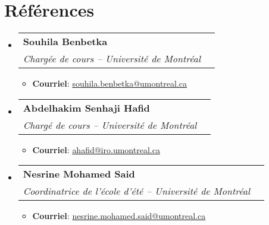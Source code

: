 \documentclass[letterpaper,11pt]{article}
\makeatletter
\newcommand{\resumeItem}[1]{
  \item\small{
    {#1 \vspace{-2pt}}
  }
}
\newcommand{\resumeSubheading}[4]{
  \vspace{-2pt}\item
    \begin{tabular*}{0.97\textwidth}[t]{l@{\extracolsep{\fill}}r}
      \textbf{#1} & #2 \\
      \textit{\small#3} & \textit{\small #4} \\
    \end{tabular*}\vspace{-7pt}
}
\newcommand{\resumeItemListStart}{\begin{itemize}}
\newcommand{\resumeItemListEnd}{\end{itemize}\vspace{-5pt}}
\makeatother
\begin{document}
\section{Références}
 \begin{itemize}[leftmargin=0.15in, label={}]
     \resumeSubheading
         {Souhila Benbetka}{}{Chargée de cours -- Université de Montréal}{}
         \resumeItemListStart
             \resumeItem{\textbf{Courriel}: \href{mailto:souhila.benbetka@umontreal.ca}{souhila.benbetka@umontreal.ca}}
         \resumeItemListEnd
         
     \resumeSubheading
         {Abdelhakim Senhaji Hafid}{}{Chargé de cours -- Université de Montréal}{}
         \resumeItemListStart
             \resumeItem{\textbf{Courriel}: \href{mailto:ahafid@iro.umontreal.ca}{ahafid@iro.umontreal.ca}}
         \resumeItemListEnd
         
     \resumeSubheading
         {Nesrine Mohamed Said}{}{Coordinatrice de l'école d'été -- Université de Montréal}{}
         \resumeItemListStart
             \resumeItem{\textbf{Courriel}: \href{mailto:nesrine.mohamed.said@umontreal.ca}{nesrine.mohamed.said@umontreal.ca}}
         \resumeItemListEnd
 \end{itemize}



\end{document}
